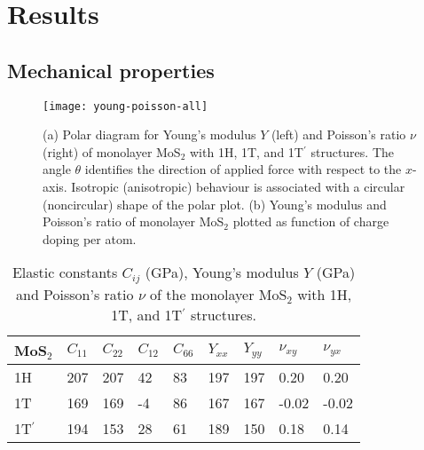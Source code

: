 \documentclass[12pt]{iopart}
\begin{document}
\section{Results}

\subsection{Mechanical properties}

\begin{figure}[t!]
  \centering \texttt{[image: young-poisson-all]}
  \caption{\label{fig:young-poisson}(a) Polar diagram for Young's modulus
    $Y$ (left) and Poisson's ratio $\nu$ (right) of monolayer MoS$_2$
    with 1H, 1T, and 1T$^\prime$ structures.  The angle $\theta$
    identifies the direction of applied force with respect to the
    $x$-axis.  Isotropic (anisotropic) behaviour is associated with a
    circular (noncircular) shape of the polar plot. (b) Young's modulus and
    Poisson's ratio of monolayer MoS$_2$ plotted as function of charge
    doping per atom.}
\end{figure}

\begin{table}[t]
  \caption{Elastic constants $C_{ij}$ (GPa), Young's modulus $Y$ (GPa)
    and Poisson's ratio $\nu$ of the monolayer MoS$_2$ with 1H, 1T,
    and 1T$^\prime$ structures.}
\centering  
\begin{tabular}{l l l l l l l l l}
\hline
MoS$_2$ & $C_{11}$& $C_{22}$& $C_{12}$& $C_{66}$& $Y_{xx}$& $Y_{yy}$& $\nu_{xy}$& $\nu_{yx}$\\ 
\hline
1H & 207& 207& 42& 83& 197& 197& 0.20& 0.20\\  
1T  & 169& 169& -4& 86& 167& 167& -0.02& -0.02\\
1T$^\prime$ & 194& 153&  28& 61& 189& 150& 0.18& 0.14
\end{tabular}
\label{table:elastic}    
\end{table}
\end{document}
